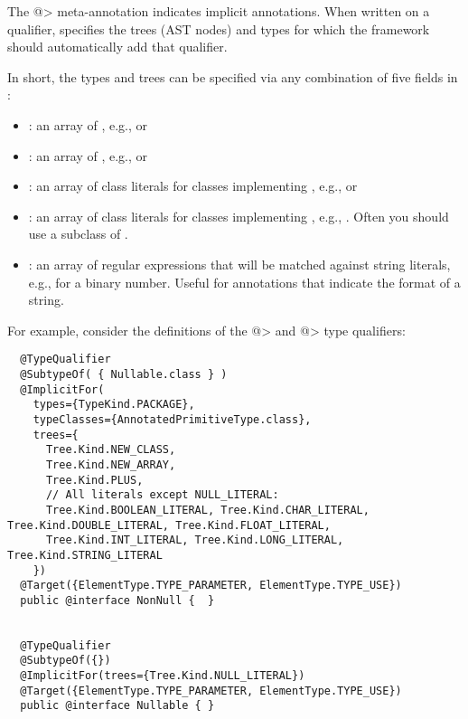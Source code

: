 The \<@> meta-annotation indicates implicit annotations.
When written on a qualifier, 
specifies the trees (AST nodes) and types for which the framework should
automatically add that qualifier.

In short, the types and trees can be
specified via any combination of five fields in :

  \begin{itemize}
  \item {}: an array of
    , e.g.,
     or 
  \item {}: an array of
    , e.g., 
    or 
  \item {}: an array of class literals for classes
    implementing , e.g.,
     or 
  \item {}: an array of class literals for classes
    implementing , e.g.,
    .  Often you should use
    a subclass of .
  \item {}: an array of regular expressions that will
    be matched against
    string literals, e.g.,  for a binary number.  Useful
    for annotations that indicate the format of a string.
  \end{itemize}

For example, consider the definitions of the \<@> and \<@>
type qualifiers:

\begin{smaller}
\begin{Verbatim}
  @TypeQualifier
  @SubtypeOf( { Nullable.class } )
  @ImplicitFor(
    types={TypeKind.PACKAGE},
    typeClasses={AnnotatedPrimitiveType.class},
    trees={
      Tree.Kind.NEW_CLASS,
      Tree.Kind.NEW_ARRAY,
      Tree.Kind.PLUS,
      // All literals except NULL_LITERAL:
      Tree.Kind.BOOLEAN_LITERAL, Tree.Kind.CHAR_LITERAL, Tree.Kind.DOUBLE_LITERAL, Tree.Kind.FLOAT_LITERAL,
      Tree.Kind.INT_LITERAL, Tree.Kind.LONG_LITERAL, Tree.Kind.STRING_LITERAL
    })
  @Target({ElementType.TYPE_PARAMETER, ElementType.TYPE_USE})
  public @interface NonNull {  }


  @TypeQualifier
  @SubtypeOf({})
  @ImplicitFor(trees={Tree.Kind.NULL_LITERAL})
  @Target({ElementType.TYPE_PARAMETER, ElementType.TYPE_USE})
  public @interface Nullable { }
\end{Verbatim}
\end{smaller}

